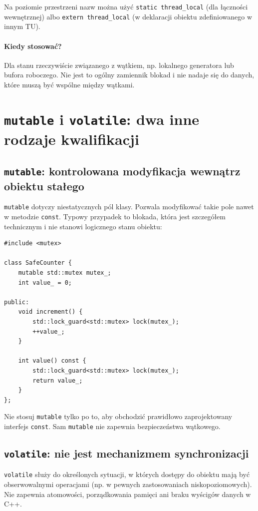Na poziomie przestrzeni nazw można użyć \texttt{static thread\_local}
(dla łączności wewnętrznej) albo \texttt{extern thread\_local}
(w deklaracji obiektu zdefiniowanego w innym TU).

\paragraph{Kiedy stosować?}
Dla stanu rzeczywiście związanego z wątkiem, np. lokalnego generatora
lub bufora roboczego. Nie jest to ogólny zamiennik blokad i nie nadaje
się do danych, które muszą być wspólne między wątkami.

\section{\texttt{mutable} i \texttt{volatile}: dwa inne rodzaje kwalifikacji}

\subsection{\texttt{mutable}: kontrolowana modyfikacja wewnątrz obiektu stałego}

\texttt{mutable} dotyczy niestatycznych pól klasy. Pozwala modyfikować
takie pole nawet w metodzie \texttt{const}. Typowy przypadek to blokada,
która jest szczegółem technicznym i nie stanowi logicznego stanu obiektu:

\begin{lstlisting}
#include <mutex>

class SafeCounter {
    mutable std::mutex mutex_;
    int value_ = 0;

public:
    void increment() {
        std::lock_guard<std::mutex> lock(mutex_);
        ++value_;
    }

    int value() const {
        std::lock_guard<std::mutex> lock(mutex_);
        return value_;
    }
};
\end{lstlisting}

Nie stosuj \texttt{mutable} tylko po to, aby obchodzić prawidłowo
zaprojektowany interfejs \texttt{const}. Sam \texttt{mutable}
nie zapewnia bezpieczeństwa wątkowego.

\subsection{\texttt{volatile}: nie jest mechanizmem synchronizacji}

\texttt{volatile} służy do określonych sytuacji, w których dostępy
do obiektu mają być obserwowalnymi operacjami (np. w pewnych
zastosowaniach niskopoziomowych). Nie zapewnia atomowości,
porządkowania pamięci ani braku wyścigów danych w C++.

